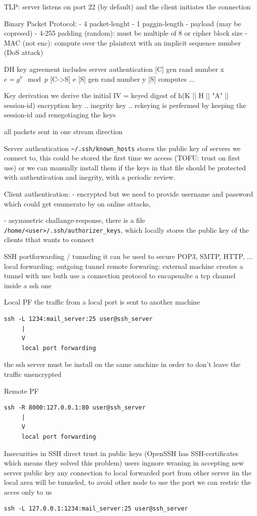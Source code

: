 \documentclass[12pt]{article}
\begin{document}
TLP:
server listens on port 22 (by default) and the client initiates the connection

Binary Packet Protocol:
- 4 packet-lenght
- 1 paggin-length
- payload (may be copresed)
- 4-255 padding (random): must be multiple of 8 or cipher block size
- MAC (not enc): compute over the plaintext with an implicit sequence number (DoS attack)

DH key agreement 
includes server authentication
[C] gen rand number x   $ e = g^x \mod{p} $
[C->S] e
[S] gen rand number y 
[S] computes
...

Key derivation
we derive the initial IV = keyed digest of h(K || H || "A" || session-id)
encryption key ..
inegrity key ..
rekeying is perfermed by keeping the session-id and renegotiaging the keys

all packets sent in one stream direction

Server authentication
\verb|~/.ssh/known_hosts| stores the public key of servers we connect to, this could be stored the first time we access (TOFU: trust on first use) or we can manually install them
if the keys in that file should be protected with authentication and inegrity, with a periodic review.

Client authentication:
- encrypted but we need to provide username and password which could get enumerato by on online attacks,

- asymmetric challange-response, there is a file \verb|/home/<user>/.ssh/authorizer_keys|, which locally stores the public key of the clients tthat wants to connect


SSH portforwarding / tunneling
it can be used to secure POP3, SMTP, HTTP, ...
local forwarding: outgoing tunnel
remote forwaring: external machine creates a tunnel with use
buth use a connection protocol to encapsualte a tcp channel inside a ssh one

Local PF
the traffic from a local port is sent to another machine
\begin{lstlisting}
ssh -L 1234:mail_server:25 user@ssh_server
     |
     V
     local port forwarding
\end{lstlisting}
the ssh server must be install on the same amchine in order to don't leave the traffic unencrypted

Remote PF
\begin{lstlisting}
ssh -R 8000:127.0.0.1:80 user@ssh_server
     |
     V
     local port forwarding
\end{lstlisting}


Insecurities in SSH
direct trust in public keys (OpenSSH has SSH-certificates which means they solved this problem)
users ingnore wraning in accepting new server public key
any connection to local forwarded port from other server iin the local area will be tunneled, to avoid other node to use the port we can restric the acces only to us
\begin{lstlisting}
ssh -L 127.0.0.1:1234:mail_server:25 user@ssh_server
\end{lstlisting}
\end{document}
